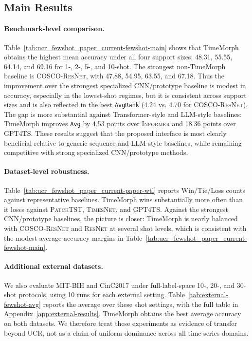 \documentclass{article}
\begin{document}
\subsection{Main Results}

\paragraph{Benchmark-level comparison.}
Table~\ref{tab:ucr_fewshot_paper_current-fewshot-main} shows that TimeMorph obtains the highest mean accuracy under all four support sizes: 48.31, 55.55, 64.14, and 69.16 for 1-, 2-, 5-, and 10-shot. The strongest non-TimeMorph baseline is \textsc{COSCO-ResNet}, with 47.88, 54.95, 63.55, and 67.18. Thus the improvement over the strongest specialized CNN/prototype baseline is modest in accuracy, especially in the lowest-shot regimes, but it is consistent across support sizes and is also reflected in the best \texttt{AvgRank} (4.24 vs. 4.70 for \textsc{COSCO-ResNet}). The gap is more substantial against Transformer-style and LLM-style baselines: TimeMorph improves \texttt{Avg} by 4.53 points over \textsc{Informer} and 18.36 points over \textsc{GPT4TS}. These results suggest that the proposed interface is most clearly beneficial relative to generic sequence and LLM-style baselines, while remaining competitive with strong specialized CNN/prototype methods.



\paragraph{Dataset-level robustness.}
Table~\ref{tab:ucr_fewshot_paper_current-paper-wtl} reports Win/Tie/Loss counts against representative baselines. TimeMorph wins substantially more often than it loses against \textsc{PatchTST}, \textsc{TimesNet}, and \textsc{GPT4TS}. Against the strongest CNN/prototype baselines, the picture is closer: TimeMorph is nearly balanced with \textsc{COSCO-ResNet} and \textsc{ResNet} at several shot levels, which is consistent with the modest average-accuracy margins in Table~\ref{tab:ucr_fewshot_paper_current-fewshot-main}.



\paragraph{Additional external datasets.}
We also evaluate MIT-BIH and CinC2017 under full-label-space 10-, 20-, and 30-shot protocols, using 10 runs for each external setting. Table~\ref{tab:external-fewshot-avg} reports the average over these shot settings, with the full table in Appendix~\ref{app:external-results}. TimeMorph obtains the best average accuracy on both datasets. We therefore treat these experiments as evidence of transfer beyond UCR, not as a claim of uniform dominance across all time-series domains.
\end{document}

